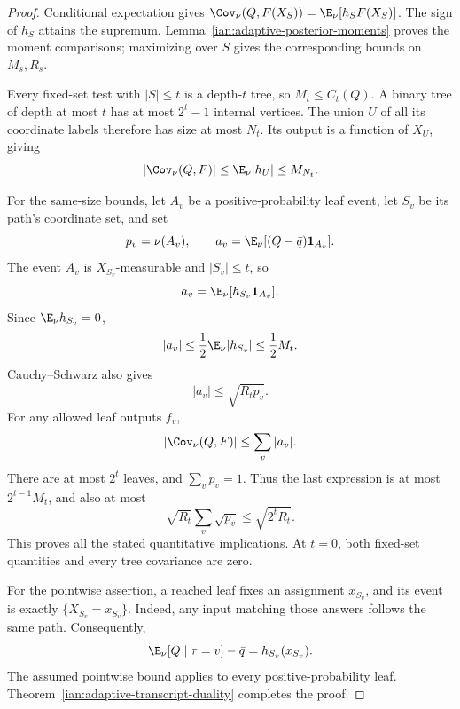 \begin{proof}
Conditional expectation gives
\(\Cov_\nu(Q,F(X_S))=\E_\nu[h_SF(X_S)]\).
The sign of \(h_S\) attains the supremum. Lemma~\ref{ian:adaptive-posterior-moments} proves the moment comparisons; maximizing over \(S\) gives the corresponding bounds on \(M_s,R_s\).

Every fixed-set test with \(|S|\le t\) is a depth-\(t\) tree, so \(M_t\le C_t(Q)\). A binary tree of depth at most \(t\) has at most \(2^t-1\) internal vertices. The union \(U\) of all its coordinate labels therefore has size at most \(N_t\). Its output is a function of \(X_U\), giving
\[
 |\Cov_\nu(Q,F)|\le\E_\nu|h_U|\le M_{N_t}.
\]

For the same-size bounds, let \(A_v\) be a positive-probability leaf event, let \(S_v\) be its path's coordinate set, and set
\[
 p_v=\nu(A_v),\qquad
 a_v=\E_\nu[(Q-\bar q)\mathbf1_{A_v}].
\]
The event \(A_v\) is \(X_{S_v}\)-measurable and \(|S_v|\le t\), so
\[
 a_v=\E_\nu[h_{S_v}\mathbf1_{A_v}].
\]
Since \(\E_\nu h_{S_v}=0\),
\[
 |a_v|\le\frac12\E_\nu|h_{S_v}|\le\frac12M_t.
\]
Cauchy--Schwarz also gives
\[
 |a_v|\le\sqrt{R_t p_v}.
\]
For any allowed leaf outputs \(f_v\),
\[
 |\Cov_\nu(Q,F)|\le\sum_v|a_v|.
\]
There are at most \(2^t\) leaves, and \(\sum_vp_v=1\). Thus the last expression is at most \(2^{t-1}M_t\), and also at most
\[
 \sqrt{R_t}\sum_v\sqrt{p_v}\le\sqrt{2^tR_t}.
\]
This proves all the stated quantitative implications. At \(t=0\), both fixed-set quantities and every tree covariance are zero.

For the pointwise assertion, a reached leaf fixes an assignment \(x_{S_v}\), and its event is exactly
\(\{X_{S_v}=x_{S_v}\}\). Indeed, any input matching those answers follows the same path. Consequently,
\[
 \E_\nu[Q\mid\tau=v]-\bar q=h_{S_v}(x_{S_v}).
\]
The assumed pointwise bound applies to every positive-probability leaf. Theorem~\ref{ian:adaptive-transcript-duality} completes the proof.
\end{proof}

